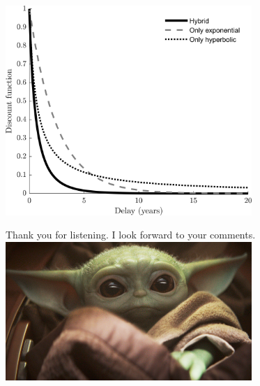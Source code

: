 \documentclass{beamer}
\numberwithin{equation}{section}
\begin{document}
\begin{frame}
\includegraphics[width=0.7\textwidth]{./figures/caseD_delta_asymptotic.jpg} 
\end{frame}


\begin{frame}
Thank you for listening. I look forward to your comments. 
\includegraphics[width=0.7\textwidth]{./figures/yoda.jpg} 
\end{frame}
\end{document}
